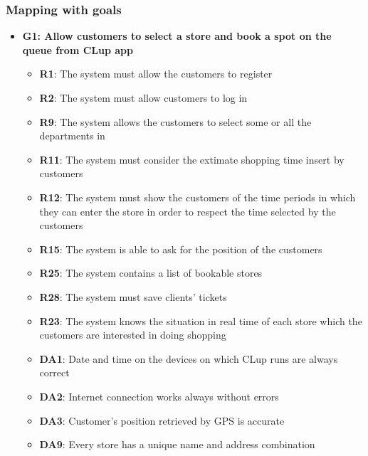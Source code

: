\documentclass{article}
\begin{document}
		\newpage
		
		\subsubsection{Mapping with goals}
			
			\begin{itemize}			

				\item {\bfseries G1: Allow customers to select a store and book a spot on the queue from CLup app}			

					\begin{itemize}
						
						\item {\bfseries R1}: The system must allow the customers to register
						\item {\bfseries R2}: The system must allow customers to log in
						\item {\bfseries R9}: The system allows the customers to select some or all the departments in
						\item {\bfseries R11}: The system must consider the extimate shopping time insert by customers
						\item {\bfseries R12}: The system must show the customers of the time periods in which they can enter the store in order to respect the time selected by the customers
						\item {\bfseries R15}: The system is able to ask for the position of the customers
						\item {\bfseries R25}: The system contains a list of bookable stores
						\item {\bfseries R28}: The system must save clients’ tickets
						\item {\bfseries R23}: The system knows the situation in real time of each store which the customers are interested in doing shopping \\
						
						\item {\bfseries DA1}: Date and time on the devices on which CLup runs are always correct
						\item {\bfseries DA2}: Internet connection works always without errors
						\item {\bfseries DA3}: Customer’s position retrieved by GPS is accurate
						\item {\bfseries DA9}: Every store has a unique name and address combination
					
					\end{itemize}
				

\end{itemize}
\end{document}
